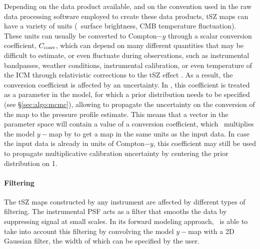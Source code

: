 Depending on the data product available, and on the convention used in the raw data processing software employed to create these data products, tSZ maps can have a variety of units (\eg\ surface brightness, CMB temperature fluctuation).
These units can usually be converted to Compton$-y$ through a scalar conversion coefficient, $C_{\rm conv}$, which can depend on many different quantities that may be difficult to estimate, or even fluctuate during observations, such as instrumental bandpasses, weather conditions, instrumental calibration, or even temperature of the ICM through relativistic corrections to the tSZ effect \citep{mroczkowski_astrophysics_2019}.
As a result, the conversion coefficient is affected by an uncertainty.
In \panco, this coefficient is treated as a parameter in the model, for which a prior distribution needs to be specified (see \S\ref{sec:algo:mcmc}), allowing to propagate the uncertainty on the conversion of the map to the pressure profile estimate.
This means that a vector in the parameter space will contain a value of a conversion coefficient, which \panco\ multiplies the model $y-$map by to get a map in the same units as the input data.
In case the input data is already in units of Compton$-y$, this coefficient may still be used to propagate multiplicative calibration uncertainty by centering the prior distribution on 1.

\paragraph{Filtering}

The tSZ maps constructed by any instrument are affected by different types of filtering.
The instrumental PSF acts as a filter that smooths the data by suppressing signal at small scales.
In its forward modeling approach, \panco\ is able to take into account this filtering by convolving the model $y-$map with a 2D Gaussian filter, the width of which can be specified by the user.


